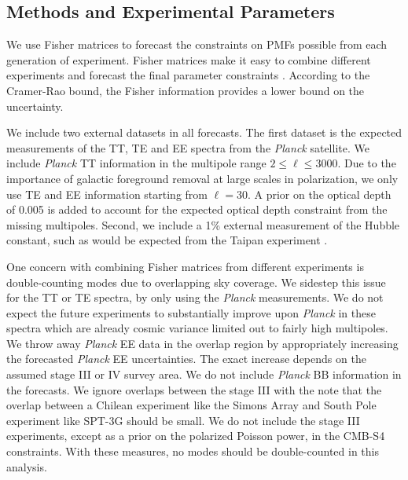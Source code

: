 \documentclass[preprint]{emulateapj}
\newcommand{\planck}{{\sl Planck}}
\begin{document}
\subsection{Methods and Experimental Parameters}

We use Fisher matrices to forecast the constraints on PMFs possible from each generation of experiment. 
Fisher matrices make it easy to combine different experiments and forecast the final parameter constraints \citep{fisher}. 
According to the Cramer-Rao bound, the Fisher information provides a lower bound on the uncertainty. 

We include two external datasets in all forecasts. 
The first dataset is the expected measurements of the  TT, TE and EE spectra from the \planck{} satellite. 
We include \planck{} TT information in the multipole range $2\le \ell \le 3000$. 
Due to the importance of galactic foreground removal at large scales in polarization, we only use TE and EE information starting from $\ell = 30$. 
A prior on the optical depth of 0.005 is added to account for the expected optical depth constraint from the missing multipoles. 
Second, we include a 1\% external measurement of the Hubble constant, such as would be expected from the Taipan experiment \citep{taipan}. 

One concern with combining Fisher matrices from different experiments is double-counting modes due to overlapping sky coverage. 
We sidestep this issue for the TT or TE spectra, by only using the \planck{} measurements. 
We do not expect the future experiments to substantially improve upon \planck{} in these spectra which are already cosmic variance limited out to fairly high multipoles. 
We throw away \planck{} EE data in the overlap region by appropriately increasing the forecasted \planck{} EE uncertainties. 
The exact increase depends on the assumed stage III or IV survey area.
We do not include \planck{} BB information in the forecasts. 
We ignore overlaps between the stage III  with the note that the overlap between a Chilean experiment like the Simons Array and South Pole experiment like SPT-3G should be small.
We do not include the stage III experiments, except as a prior on the polarized Poisson power, in the CMB-S4 constraints. 
With these measures, no modes should be double-counted in this analysis. 
\end{document}
